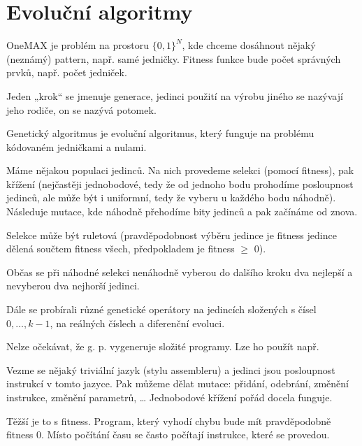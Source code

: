 \documentclass[12pt]{article}					%
\begin{document}

\section{Evoluční algoritmy}
\begin{definice}[OneMAX]
	OneMAX je problém na prostoru $\{0, 1\}^N$, kde chceme dosáhnout nějaký (neznámý) pattern, např. samé jedničky. Fitness funkce bude počet správných prvků, např. počet jedniček.
\end{definice}

\begin{definice}
	Jeden „krok“ se jmenuje generace, jedinci použití na výrobu jiného se nazývají jeho rodiče, on se nazývá potomek.
\end{definice}

\begin{definice}
	Genetický algoritmus je evoluční algoritmus, který funguje na problému kódovaném jedničkami a nulami.
	
	Máme nějakou populaci jedinců. Na nich provedeme selekci (pomocí fitness), pak křížení (nejčastěji jednobodové, tedy že od jednoho bodu prohodíme posloupnost jedinců, ale může být i uniformní, tedy že vyberu u každého bodu náhodně). Následuje mutace, kde náhodně přehodíme bity jedinců a pak začínáme od znova.

	Selekce může být ruletová (pravděpodobnost výběru jedince je fitness jedince dělená součtem fitness všech, předpokladem je fitness $≥$ 0).
\end{definice}

\begin{definice}[Elitismus]
	Občas se při náhodné selekci nenáhodně vyberou do dalšího kroku dva nejlepší a nevyberou dva nejhorší jedinci.
\end{definice}


Dále se probírali různé genetické operátory na jedincích složených s čísel $0, …, k-1$, na reálných číslech a diferenční evoluci.


\begin{definice}
	Nelze očekávat, že g. p. vygeneruje složité programy. Lze ho použít např. 
\end{definice}

\begin{definice}
	Vezme se nějaký triviální jazyk (stylu assembleru) a jedinci jsou posloupnost instrukcí v tomto jazyce. Pak můžeme dělat mutace: přidání, odebrání, změnění instrukce, změnění parametrů, … Jednobodové křížení pořád docela funguje.

	Těžší je to s fitness. Program, který vyhodí chybu bude mít pravděpodobně fitness 0. Místo počítání času se často počítají instrukce, které se provedou.
\end{definice}
\end{document}
